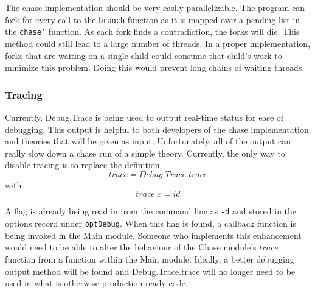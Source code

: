 			The chase implementation should be very easily parallelizable. The
			program can fork for every call to the {\tt branch} function as it
			is mapped over a pending list in the {\tt chase'} function. As each
			fork finds a contradiction, the forks will die. This method could
			still lead to a large number of threads. In a proper implementation,
			forks that are waiting on a single child could consume that child's
			work to minimize this problem. Doing this would prevent long chains
			of waiting threads.

		\subsubsection{Tracing}

			Currently, Debug.Trace is being used to output real-time status for
			ease of debugging. This output is helpful to both developers of
			the chase implementation and theories that will be given as input.
			Unfortunately, all of the output can really slow down a chase run
			of a simple theory. Currently, the only way to disable tracing is
			to replace the definition \[trace = Debug.Trace.trace\] with
			\[trace\ x = id\]

			A flag is already being read in from the command line as {\tt -d}
			and stored in the options record under {\tt optDebug}. When this
			flag is found, a callback function is being invoked in the Main
			module. Someone who implements this enhancement would need to be
			able to alter the behaviour of the Chase module's $trace$ function
			from a function within the Main module. Ideally, a better
			debugging output method will be found and Debug.Trace.trace will no
			longer need to be used in what is otherwise production-ready code.
